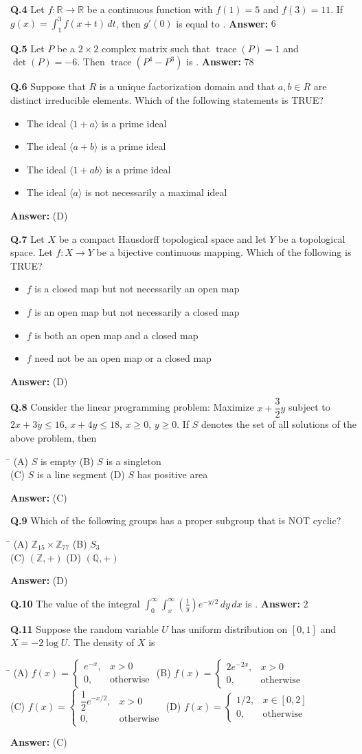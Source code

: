 \documentclass[11pt,a4paper]{article}
\newcommand{\optsfourA}[4]{%
  \begin{tabbing}
    \hspace{0.48\linewidth}\=\kill
    (A) #1 \> (B) #2 \\[2pt]
    (C) #3 \> (D) #4
  \end{tabbing}%
}
\newcommand{\optslistA}[4]{%
  \begin{itemize}
    \setlength{\itemsep}{2pt}\setlength{\parskip}{0pt}
    \item[(A)] #1
    \item[(B)] #2
    \item[(C)] #3
    \item[(D)] #4
  \end{itemize}%
}
\newcommand{\ans}[1]{\textbf{Answer:} #1\par\medskip}
\begin{document}
\textbf{Q.4} Let $f : \mathbb{R} \to \mathbb{R}$ be a continuous function with $f(1) = 5$ and $f(3) = 11$. If $g(x) = \displaystyle\int_1^3 f(x + t)\,dt$, then $g'(0)$ is equal to \underline{\hspace{2cm}}.
\ans{$6$}

\textbf{Q.5} Let $P$ be a $2 \times 2$ complex matrix such that $\operatorname{trace}(P) = 1$ and $\det(P) = -6$. Then $\operatorname{trace}(P^4 - P^3)$ is \underline{\hspace{2cm}}.
\ans{$78$}

\textbf{Q.6} Suppose that $R$ is a unique factorization domain and that $a, b \in R$ are distinct irreducible elements. Which of the following statements is TRUE?
\optslistA{The ideal $\langle 1 + a \rangle$ is a prime ideal}{The ideal $\langle a + b \rangle$ is a prime ideal}{The ideal $\langle 1 + ab \rangle$ is a prime ideal}{The ideal $\langle a \rangle$ is not necessarily a maximal ideal}
\ans{(D)}

\textbf{Q.7} Let $X$ be a compact Hausdorff topological space and let $Y$ be a topological space. Let $f : X \to Y$ be a bijective continuous mapping. Which of the following is TRUE?
\optslistA{$f$ is a closed map but not necessarily an open map}{$f$ is an open map but not necessarily a closed map}{$f$ is both an open map and a closed map}{$f$ need not be an open map or a closed map}
\ans{(D)}

\textbf{Q.8} Consider the linear programming problem: Maximize $x + \dfrac{3}{2}y$ subject to $2x + 3y \le 16$, $x + 4y \le 18$, $x \ge 0$, $y \ge 0$. If $S$ denotes the set of all solutions of the above problem, then
\optsfourA{$S$ is empty}{$S$ is a singleton}{$S$ is a line segment}{$S$ has positive area}
\ans{(C)}

\textbf{Q.9} Which of the following groups has a proper subgroup that is NOT cyclic?
\optsfourA{$\mathbb{Z}_{15} \times \mathbb{Z}_{77}$}{$S_3$}{$(\mathbb{Z}, +)$}{$(\mathbb{Q}, +)$}
\ans{(D)}

\textbf{Q.10} The value of the integral $\displaystyle\int_0^\infty \int_x^\infty \left(\frac{1}{y}\right) e^{-y/2}\,dy\,dx$ is \underline{\hspace{2cm}}.
\ans{$2$}

\textbf{Q.11} Suppose the random variable $U$ has uniform distribution on $[0, 1]$ and $X = -2\log U$. The density of $X$ is
\optsfourA{$f(x) = \begin{cases} e^{-x}, & x > 0 \\ 0, & \text{otherwise} \end{cases}$}{$f(x) = \begin{cases} 2e^{-2x}, & x > 0 \\ 0, & \text{otherwise} \end{cases}$}{$f(x) = \begin{cases} \dfrac{1}{2}e^{-x/2}, & x > 0 \\ 0, & \text{otherwise} \end{cases}$}{$f(x) = \begin{cases} 1/2, & x \in [0, 2] \\ 0, & \text{otherwise} \end{cases}$}
\ans{(C)}
\end{document}
